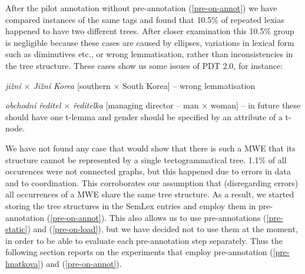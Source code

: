 \documentclass[11pt]{article}
\begin{document}


After the pilot annotation without pre-annotation (\ref{pre-on-annot})  we have compared instances of the same tags and found that 10.5\% of repeated lexias happened to have two different trees. After closer examination this 10.5\% group is negligible because these cases are caused by ellipses, variations in lexical form such as diminutives etc., or wrong lemmatisation, rather than inconsistencies in the tree structure. These cases show us some issues of PDT 2.0, for instance:
\begin{compactitem}
\item \textit{jižní $\times$ Jižní Korea} [southern $\times$ South Korea] -- wrong lemmatisation
\item \textit{obchodní ředitel $\times$ ředitelka} [managing director -- man $\times$ woman] -- in future these should have one t-lemma and gender should be specified by an attribute of a t-node.
\end{compactitem}

We have not fo\-und any case that would show that there is such a MWE that its structure cannot be represented by a single tectogrammatical tree. 1.1\% of all occurences were not connected graphs, but this happened due to errors in data and to coordination. This corroborates our assumption that (disregarding errors) all occurrences of a MWE share the same tree structure. As a result, we started storing the tree structures in the SemLex entries and employ them in pre-annotation (\ref{pre-on-annot}). This also allows us to use pre-annotations (\ref{pre-static}) and (\ref{pre-on-load}), but we have decided not to use them at the moment, in order to be able to evaluate each pre-annotation step separately. Thus the following section reports on the experiments that employ pre-annotation (\ref{pre-hnatkova}) and (\ref{pre-on-annot}).
\end{document}
